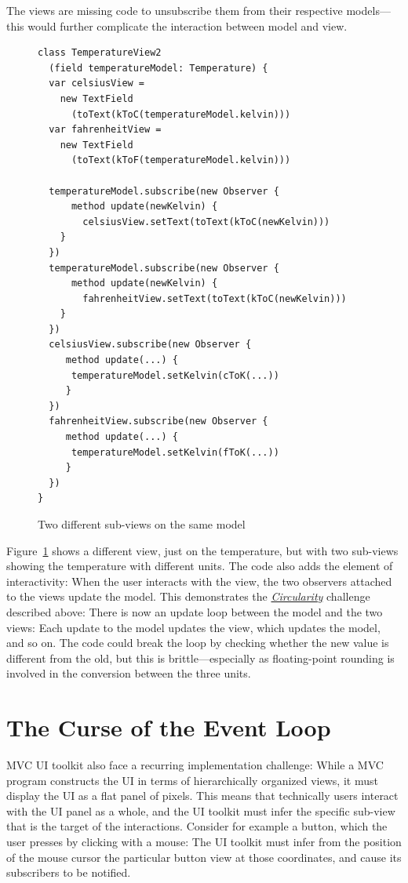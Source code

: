 \documentclass[sigplan,screen]{acmart}
\begin{document}
The views are missing code to unsubscribe them from their
respective models---this would further complicate the interaction between
model and view.

\begin{figure}[tb]
\begin{verbatim}
class TemperatureView2
  (field temperatureModel: Temperature) {
  var celsiusView =
    new TextField
      (toText(kToC(temperatureModel.kelvin)))
  var fahrenheitView =
    new TextField
      (toText(kToF(temperatureModel.kelvin)))

  temperatureModel.subscribe(new Observer {
      method update(newKelvin) {
        celsiusView.setText(toText(kToC(newKelvin)))
    }
  })
  temperatureModel.subscribe(new Observer {
      method update(newKelvin) {
        fahrenheitView.setText(toText(kToC(newKelvin)))
    }
  })
  celsiusView.subscribe(new Observer {
     method update(...) {
      temperatureModel.setKelvin(cToK(...))
     }
  })
  fahrenheitView.subscribe(new Observer {
     method update(...) {
      temperatureModel.setKelvin(fToK(...))
     }
  })
}
\end{verbatim}
  \vspace*{-2ex}
  \caption{Two different sub-views on the same model}
  \label{fig:temperature-view2}
\end{figure}
%
Figure~\ref{fig:temperature-view2} shows a different view, just on the
temperature, but with two sub-views showing the temperature with
different units.  The code also adds the element of interactivity:
When the user interacts with the view, the two observers attached to
the views update the model.  This demonstrates the
\hyperlink{challenge:circularity}{\textit{Circularity}} challenge
described above: There is now an update loop between the model and
the two views: Each update to the model updates the view, which
updates the model, and so on.  The code could break the loop by
checking whether the new value is different from the old, but this is brittle---especially as
floating-point rounding is involved in the conversion between the
three units.

\section{The Curse of the Event Loop}
\label{sec:event-loop}

MVC UI toolkit also face a recurring implementation challenge: While a
MVC program constructs the UI in terms of hierarchically organized
views, it must display the UI as a flat panel of pixels.  This means
that technically users interact with the UI panel as a whole, and the
UI toolkit must infer the specific sub-view that is the target of the interactions.
Consider for example a button, which the user presses by clicking with
a mouse: The UI toolkit must infer from the position of the mouse
cursor the particular button view at those coordinates, and cause its
subscribers to be notified.
\end{document}
